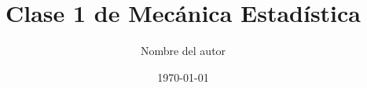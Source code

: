 \documentclass[a4paper,12pt]{article}
\begin{document}
\title{Clase 1 de Mecánica Estadística}
\author{Nombre del autor}
\date{\today}
\maketitle

\tableofcontents
\newpage



\printbibliography
\end{document}
